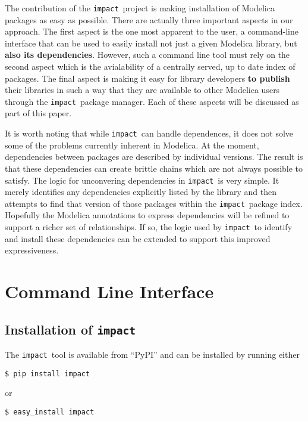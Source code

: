 \documentclass[11pt,a4paper,twocolumn]{article}
\newcommand{\impact}{\texttt{impact}} %
\begin{document}
The contribution of the \impact\ project is making installation of
Modelica packages as easy as possible.  There are actually three
important aspects in our approach.  The first aspect is the one most
apparent to the user, a command-line interface that can be used to
easily install not just a given Modelica library, but \textbf{also its
  dependencies}.  However, such a command line tool must rely on the
second aspect which is the avialability of a centrally served, up to
date index of packages.  The final aspect is making it easy for
library developers \textbf{to publish} their libraries in such a way
that they are available to other Modelica users through the
\impact\ package manager.  Each of these aspects will be discussed as
part of this paper.

It is worth noting that while \impact\ can handle dependences, it
does not solve some of the problems currently inherent in Modelica.  At
the moment, dependencies between packages are described by individual
versions.  The result is that these dependencies can create brittle
chains which are not always possible to satisfy. The logic for
unconvering dependencies in \impact\ is very simple.  It merely
identifies any dependencies explicitly listed by the library and then
attempts to find that version of those packages within the
\impact\ package index. Hopefully the Modelica annotations to express
dependencies will be refined to support a richer set of relationships.
If so, the logic used by \impact\ to identify and install these
dependencies can be extended to support this improved expressiveness.

\section{Command Line Interface}
\label{sec:command_line}

\subsection{Installation of \impact}
\label{sec:install}

The \impact\ tool is available from ``PyPI''\cite{pypi} and can be
installed by running either

\begin{verbatim}
$ pip install impact
\end{verbatim}
or
\begin{verbatim}
$ easy_install impact
\end{verbatim}
\end{document}
